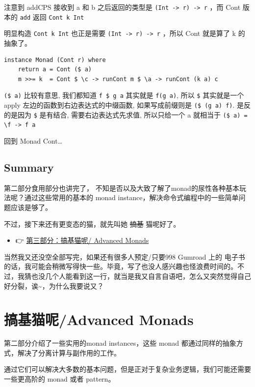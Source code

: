 \documentclass[letterspacing]{tufte-book}
\begin{document}
注意到 addCPS 接收到 a 和 b 之后返回的类型是 \texttt{(Int -> r) -> r} ，而 Cont 版本的 \texttt{add} 返回 \texttt{Cont k Int}

明显构造 \texttt{Cont k Int} 也正是需要 \texttt{(Int -> r) -> r} ，所以 Cont 就是算了 k 的抽象了。

\lstset{language=haskell,label= ,caption= ,captionpos=b,numbers=none}
\begin{lstlisting}
instance Monad (Cont r) where
    return a = Cont ($ a)
    m >>= k  = Cont $ \c -> runCont m $ \a -> runCont (k a) c
\end{lstlisting}

\texttt{(\$ a)} 比较有意思, 我们都知道 \texttt{f \$ g a} 其实就是 \texttt{f(g a)}, 所以 \texttt{\$} 其实就是一个 apply 左边的函数到右边表达式的中缀函数, 如果写成前缀则是
\texttt{(\$ (g a) f)}. 是反的是因为 \texttt{\$} 是有结合, 需要右边表达式先求值, 所以只给一个 a 就相当于 \texttt{(\$ a) = \textbackslash{}f -> f a}

回到 Monad Cont\ldots{}

\chapter{Summary}
\label{sec:org539d46d}
第二部分食用部分也讲完了， 不知是否以及大致了解了monad的尿性各种基本玩法呢？通过这些常用的基本的 monad instance，解决命令式编程中的一些简单问题应该是够了。

不过，接下来还有更变态的猫，就先叫她 \sout{搞基} 猫呢好了。

\begin{itemize}
\item 👉 \href{./part3.org}{第三部分：搞基猫呢/ Advanced Monads}
\end{itemize}

当然我又还没空全部写完，如果还有很多人预定/只要998 Gumroad 上的  电子书的话，我可能会稍微写得快一些。毕竟，写了也没人感兴趣也怪浪费时间的。不过，我猜也没几个人能看到这一行，就当是我又自言自语吧，怎么又突然觉得自己好分裂，诶\textasciitilde{}，为什么我要说又？

\part{搞基猫呢/Advanced Monads}
\label{sec:orgbc34df1}
第二部分介绍了一些实用的monad instances，这些 monad 都通过同样的抽象方式，解决了分离计算与副作用的工作。

通过它们可以解决大多数的基本问题，但是正对于复杂业务逻辑，我们可能还需要一些更高阶的 monad 或者 pattern。
\end{document}
